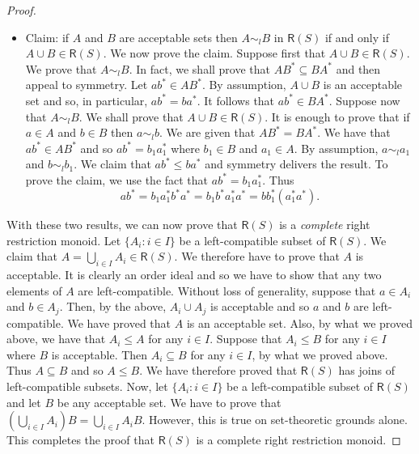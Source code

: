 \documentclass[a4paper]{amsart}
\begin{document}
\begin{proof}
\begin{itemize}
\item Claim: if $A$ and $B$ are acceptable sets then
$A \sim_{l} B$ in $\mathsf{R}(S)$ if and only if $A \cup B \in \mathsf{R}(S)$.
We now prove the claim.
Suppose first that $A \cup B \in \mathsf{R}(S)$.
We prove that $A \sim_{l} B$.
In fact, we shall prove that $AB^{\ast} \subseteq BA^{\ast}$ and then appeal to symmetry.
Let $ab^{\ast} \in AB^{\ast}$.
By assumption, $A \cup B$ is an acceptable set and so, in particular,
$ab^{\ast} = ba^{\ast}$.
It follows that $ab^{\ast} \in BA^{\ast}$. 
Suppose now that  $A \sim_{l} B$.
We shall prove that $A \cup B \in \mathsf{R}(S)$. 
It is enough to prove that if $a \in A$ and $b \in B$ then $a \sim_{l} b$.
We are given that $AB^{\ast} = BA^{\ast}$.
We have that $ab^{\ast} \in AB^{\ast}$ and so $ab^{\ast} = b_{1}a_{1}^{\ast}$ where $b_{1} \in B$ and $a_{1} \in A$.
By assumption, $a \sim_{l} a_{1}$ and $b \sim_{l} b_{1}$.
We claim that $ab^{\ast} \leq ba^{\ast}$ and symmetry delivers the result.
To prove the claim, we use the fact that  $ab^{\ast} = b_{1}a_{1}^{\ast}$.
Thus 
$$ab^{\ast} = b_{1}a_{1}^{\ast}b^{\ast}a^{\ast} = b_{1}b^{\ast}a_{1}^{\ast}a^{\ast} = bb_{1}^{\ast}(a_{1}^{\ast}a^{\ast}).$$

\end{itemize}



With these two results, we can now prove that $\mathsf{R}(S)$ is a {\em complete} right restriction monoid.
Let $\{A_{i} \colon i \in I\}$ be a left-compatible subset of $\mathsf{R}(S)$.
We claim that $A = \bigcup_{i \in I} A_{i} \in \mathsf{R}(S)$.
We therefore have to prove that $A$ is acceptable.
It is clearly an order ideal and so we have to show that any two elements of $A$ are left-compatible.
Without loss of generality, suppose that $a \in A_{i}$ and $b \in A_{j}$.
Then, by the above, $A_{i} \cup A_{j}$ is acceptable and so $a$ and $b$ are left-compatible.
We have proved that $A$ is an acceptable set.
Also, by what we proved above, we have that $A_{i} \leq A$ for any $i \in I$.
Suppose that $A_{i} \leq B$ for any $i \in I$ where $B$ is acceptable.
Then $A_{i} \subseteq B$ for any $i \in I$, by what we proved above.
Thus $A \subseteq B$ and so $A \leq B$.
We have therefore proved that $\mathsf{R}(S)$ has joins of left-compatible subsets.
Now, let $\{A_{i} \colon i \in I\}$ be a left-compatible subset of $\mathsf{R}(S)$ and let $B$ be any acceptable set.
We have to prove that 
$\left( \bigcup_{i \in I}  A_{i} \right)B  =   \bigcup_{i \in I}  A_{i}B$.
However, this is true on set-theoretic grounds alone.
This completes the proof that $\mathsf{R}(S)$ is a  complete right restriction monoid.


\end{proof}
\end{document}
